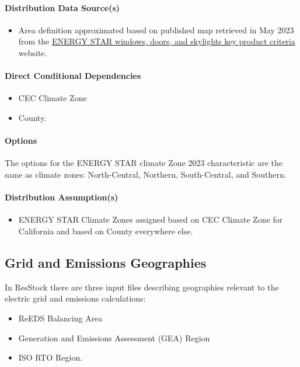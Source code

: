 \paragraph{Distribution Data Source(s)}
\begin{itemize}
    \item Area definition approximated based on published map retrieved in May 2023 from the \href{https://www.energystar.gov/products/residential_windows_doors_and_skylights/key_product_criteria}{ENERGY STAR windows, doors, and skylights key product criteria} website. 
\end{itemize}

\paragraph{Direct Conditional Dependencies}
\begin{itemize}
    \item CEC Climate Zone
    \item County.
\end{itemize}

\paragraph{Options}
The options for the ENERGY STAR climate Zone 2023 characteristic are the same as climate zones: North-Central, Northern, South-Central, and Southern. 

\paragraph{Distribution Assumption(s)}
\begin{itemize}
    \item ENERGY STAR Climate Zones assigned based on CEC Climate Zone for California and based on County everywhere else.
\end{itemize}

\subsection{Grid and Emissions Geographies}

In ResStock there are three input files describing geographies relevant to the electric grid and emissions calculations:

\begin{itemize}
    \item ReEDS Balancing Area
    \item Generation and Emissions Assessment (GEA) Region
    \item ISO RTO Region.
\end{itemize}

